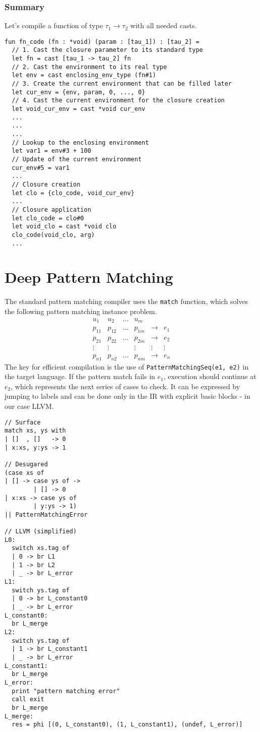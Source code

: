 \documentclass{article}
\newcommand*{\impl}{\mathbin{\to}}
\begin{document}
\subsubsection{Summary}
Let's compile a function of type $\tau_1\impl\tau_2$ with all needed casts.

\begin{verbatim}
fun fn_code (fn : *void) (param : [tau_1]) : [tau_2] = 
  // 1. Cast the closure parameter to its standard type
  let fn = cast [tau_1 -> tau_2] fn
  // 2. Cast the environment to its real type
  let env = cast enclosing_env_type (fn#1)
  // 3. Create the current environment that can be filled later
  let cur_env = {env, param, 0, ..., 0}
  // 4. Cast the current environment for the closure creation
  let void_cur_env = cast *void cur_env
  ...
  ...
  ...
  // Lookup to the enclosing environment
  let var1 = env#3 + 100
  // Update of the current environment
  cur_env#5 = var1
  ...
  // Closure creation
  let clo = {clo_code, void_cur_env}
  ...
  // Closure application
  let clo_code = clo#0
  let void_clo = cast *void clo
  clo_code(void_clo, arg)
  ...
\end{verbatim}

\section{Deep Pattern Matching}
The standard pattern matching compiler uses the \texttt{match} function, which solves
the following pattern matching instance problem.
\[
\begin{array}{ccccccc}
    u_1 & u_2 & \dots & u_m \\ \hline
    p_{11} & p_{12} & \dots & p_{1m} & \rightarrow & e_1 \\
    p_{21} & p_{22} & \dots & p_{2m} & \rightarrow & e_2 \\
    \vdots & \vdots &       & \vdots & \vdots      & \vdots \\
    p_{n1} & p_{n2} & \dots & p_{nm} & \rightarrow & e_n
\end{array}
\]
The key for efficient compilation is the use of \texttt{PatternMatchingSeq(e1, e2)} in the target language.
If the pattern match fails in $e_1$, execution should continue at $e_2$, which represents the next series of cases to check.
It can be expressed by jumping
to labels and can be done only in the IR with explicit basic blocks - in our case LLVM.

\begin{verbatim}
// Surface
match xs, ys with
| []  , []   -> 0
| x:xs, y:ys -> 1

// Desugared
(case xs of
| [] -> case ys of ->
        | [] -> 0
| x:xs -> case ys of 
        | y:ys -> 1)
|| PatternMatchingError

// LLVM (simplified)
L0:
  switch xs.tag of
  | 0 -> br L1
  | 1 -> br L2
  | _ -> br L_error
L1:
  switch ys.tag of
  | 0 -> br L_constant0
  | _ -> br L_error
L_constant0:
  br L_merge
L2:
  switch ys.tag of
  | 1 -> br L_constant1
  | _ -> br L_error
L_constant1:
  br L_merge
L_error:
  print "pattern matching error"
  call exit
  br L_merge
L_merge:
  res = phi [(0, L_constant0), (1, L_constant1), (undef, L_error)]

    
\end{verbatim}
\end{document}
